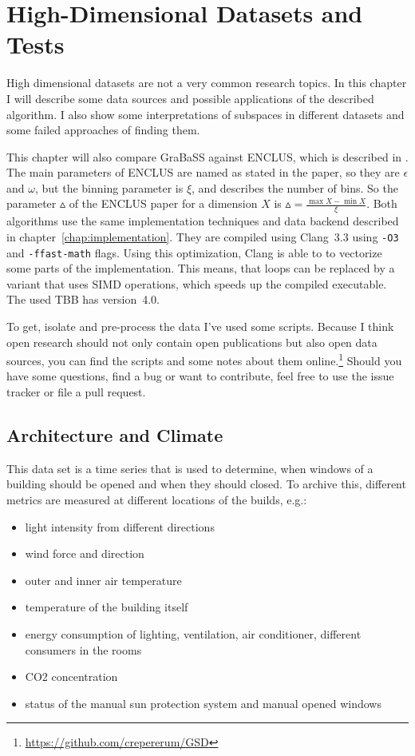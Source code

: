 \chapter{High-Dimensional Datasets and Tests}\label{chap:datasets}
High dimensional datasets are not a very common research topics. In this chapter I will describe some data sources and possible applications of the described algorithm. I also show some interpretations of subspaces in different datasets and some failed approaches of finding them.

This chapter will also compare GraBaSS against ENCLUS, which is described in \cite{enclus}. The main parameters of ENCLUS are named as stated in the paper, so they are $\epsilon$ and $\omega$, but the binning parameter is $\xi$, and describes the number of bins. So the parameter $\vartriangle$ of the ENCLUS paper for a dimension $X$ is $\vartriangle = \frac{\max{X} - \min{X}}{\xi}$. Both algorithms use the same implementation techniques and data backend described in chapter~\ref{chap:implementation}. They are compiled using Clang~3.3 using \texttt{-O3} and \texttt{-ffast-math} flags. Using this optimization, Clang is able to to vectorize some parts of the implementation. This means, that loops can be replaced by a variant that uses SIMD operations, which speeds up the compiled executable. The used TBB has version~4.0.

To get, isolate and pre-process the data I've used some scripts. Because I think open research should not only contain open publications but also open data sources, you can find the scripts and some notes about them online.\footnote{\url{https://github.com/crepererum/GSD}} Should you have some questions, find a bug or want to contribute, feel free to use the issue tracker or file a pull request.

\section{Architecture and Climate}
This data set is a time series that is used to determine, when windows of a building should be opened and when they should closed. To archive this, different metrics are measured at different locations of the builds, e.g.:
\begin{itemize}
	\item light intensity from different directions
	\item wind force and direction
	\item outer and inner air temperature
	\item temperature of the building itself
	\item energy consumption of lighting, ventilation, air conditioner, different consumers in the rooms
	\item CO2 concentration
	\item status of the manual sun protection system and manual opened windows
\end{itemize}


